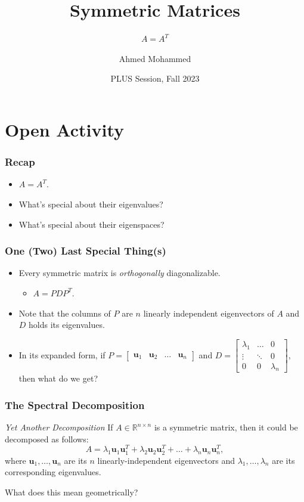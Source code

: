 \documentclass{beamer}
\title{Symmetric Matrices}
\subtitle{\(A = A^T\)}
\author{Ahmed Mohammed}
\institute{Georgia Institute of Technology}
\date{PLUS Session, Fall 2023}
\renewcommand{\vec}[1]{\mathbf{#1}}
\begin{document}
	\begin{frame}
		\maketitle
	\end{frame}

	\section{Open Activity}
	\begin{frame}
		\frametitle{Recap}
		\begin{itemize}
			\item<1-> \(A = A^T.\)
			\item<2-> What's special about their eigenvalues?
			\item<3-> What's special about their eigenspaces?
		\end{itemize}
	\end{frame}

	\begin{frame}
		\frametitle{One (Two) Last Special Thing(s)}
		\begin{itemize}
			\item<1-> Every symmetric matrix is \emph{orthogonally} diagonalizable.
				\begin{itemize}[<+(1)->]
					\item \(A = PDP^T.\)
				\end{itemize}
			\item<2-> Note that the columns of \(P\) are \(n\) linearly independent eigenvectors of \(A\) and \(D\) holds its eigenvalues.
			\item<3-> In its expanded form, if \(P = \begin{bmatrix}\vec{u}_1 & \vec{u}_2 & \dots & \vec{u}_n\end{bmatrix}\) and 
					\(D = \begin{bmatrix}\lambda_1 & \dots & 0 \\ \vdots & \ddots & 0 \\ 0 & 0 & \lambda_n \end{bmatrix},\) then what do we get?
		\end{itemize}
	\end{frame}

	\begin{frame}
		\frametitle{The Spectral Decomposition}
		\begin{block}{\textit{Yet Another Decomposition}}
			If \(A \in \mathbb{R}^{n \times n}\) is a symmetric matrix, then it could be decomposed as follows: 
			\[A = \lambda_1 \vec{u}_1\vec{u}_1^T + \lambda_2 \vec{u}_2\vec{u}_2^T + \dots + \lambda_n\vec{u}_n\vec{u}_n^T,\] where 
			\(\vec{u}_1, \dots, \vec{u}_n\) are its \(n\) linearly-independent eigenvectors and \(\lambda_1, \dots, \lambda_n\) are its corresponding 
			eigenvalues.
		\end{block}
		What does this mean geometrically?
	\end{frame}
\end{document}
